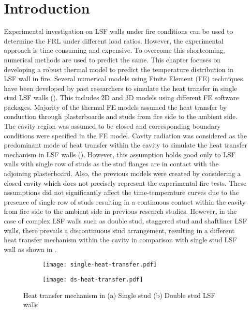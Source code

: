 \section{Introduction}

Experimental investigation on LSF walls under fire conditions can be used to determine the FRL under different load ratios. However, the experimental approach is time consuming and expensive. To overcome this shortcoming, numerical methods are used to predict the same. This chapter focuses on developing a robust thermal model to predict the temperature distribution in LSF wall in fire. Several numerical models using Finite Element (FE) techniques have been developed by past researchers to simulate the heat transfer in single stud LSF walls (\cite{Feng2003,Keerthan2012,Ariyanayagam2019}). This includes 2D and 3D models using different FE software packages. Majority of the thermal FE models assumed the heat transfer by conduction through plasterboards and studs from fire side to the ambient side. The cavity region was assumed to be closed and corresponding boundary conditions were specified in the FE model. Cavity radiation was considered as the predominant mode of heat transfer within the cavity to simulate the heat transfer mechanism in LSF walls (\cite{Rusthi2017,Ariyanayagam2019}). However, this assumption holds good only to LSF walls with single row of studs as the stud flanges are in contact with the adjoining plasterboard. Also, the previous models were created by considering a closed cavity which does not precisely represent the experimental fire tests. These assumptions did not significantly affect the time-temperature curves due to the presence of single row of studs resulting in a continuous contact within the cavity from fire side to the ambient side in previous research studies. However, in the case of complex LSF walls such as double stud, staggered stud and shaftliner LSF walls, there prevails a discontinuous stud arrangement, resulting in a different heat transfer mechanism within the cavity in comparison with single stud LSF wall as shown in .  
\begin{figure}[!htbp]
	\centering
	\begin{subfigure}[b]{0.5\textwidth}
		\centering
		\texttt{[image: single-heat-transfer.pdf]}
		\caption{}
		\label{subfig:single-heat-transfer}
	\end{subfigure}
	\begin{subfigure}[b]{0.5\textwidth}
		\centering
		\texttt{[image: ds-heat-transfer.pdf]}
		\caption{}
		\label{subfig:ds-heat-transfer}
	\end{subfigure}
	   \caption{Heat transfer mechanism in (a) Single stud (b) Double stud LSF walls}
	   \label{fig:heat-transfer}
\end{figure} 

